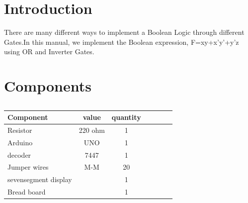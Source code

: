 \documentclass[10pt, a4paper]{article}
\title{\mytitle}
\author{\myauthor\hspace{1em}\\\contact\\IITH\hspace{0.5em}-\hspace{0.5em}\mymodule}
\date{}
\begin{document}
	\maketitle
	\tableofcontents
	\begin{abstract}
		This manual shows how to implement Boolean Logic with OR and Inverter Gates through 7447 BCD-Seven Segment Display Decoder
	\end{abstract}
    \section{Introduction}
    There are many different ways to implement a Boolean Logic through different Gates.In this manual, we implement the Boolean expression, F=xy+x'y'+y'z using OR and Inverter Gates.
	\section{Components}
	
\begin{table}[htbp]
 \begin{center}
    \begin{tabular}{|l|c|c|c|c|c|c} \hline \textbf{Component}
  & \textbf{value} & \textbf{quantity} \\
 \hline
Resistor & 220 ohm & 1 \\ \hline
Arduino & UNO & 1 \\ \hline
decoder & 7447 & 1  \\ \hline
Jumper wires & M-M & 20\\ \hline
sevensegment display &  & 1 \\ \hline
Bread board &  & 1 \\ \hline
\end{tabular}   
\end{center}
\caption{\label{table:table} }
\end{table}
\end{document}
